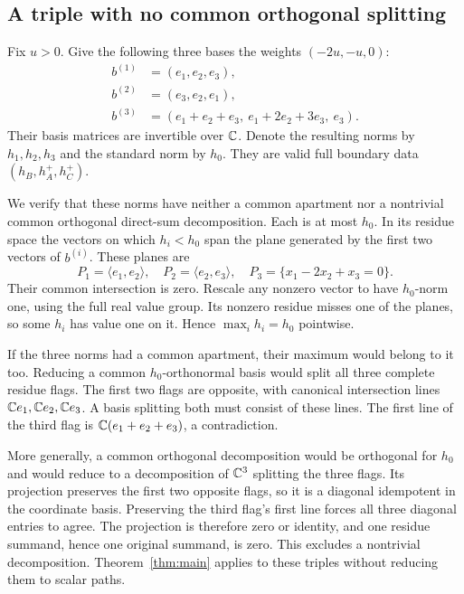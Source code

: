 \subsection{A triple with no common orthogonal splitting}
Fix $u>0$. Give the following three bases the weights $(-2u,-u,0)$:
\begin{equation}\label{eq:irreducibletriple}
 \begin{split}
 b^{(1)}&=(e_1,e_2,e_3),\\
 b^{(2)}&=(e_3,e_2,e_1),\\
 b^{(3)}&=(e_1+e_2+e_3,\ e_1+2e_2+3e_3,\ e_3).
 \end{split}
\end{equation}
Their basis matrices are invertible over $\mathbb C$. Denote the
resulting norms by $h_1,h_2,h_3$ and the standard norm by $h_0$.
They are valid full boundary data $(h_B,h_A^+,h_C^+)$.

We verify that these norms have neither a common apartment nor
a nontrivial common orthogonal direct-sum decomposition.
Each is at most $h_0$. In its residue space the vectors on
which $h_i<h_0$ span the plane generated by the first two
vectors of $b^{(i)}$. These planes are
\[
 P_1=\langle e_1,e_2\rangle,\quad
 P_2=\langle e_2,e_3\rangle,\quad
 P_3=\{x_1-2x_2+x_3=0\}.
\]
Their common intersection is zero. Rescale any nonzero vector
to have $h_0$-norm one, using the full real value group.
Its nonzero residue misses one of the planes, so some $h_i$
has value one on it. Hence $\max_i h_i=h_0$ pointwise.

If the three norms had a common apartment, their maximum
would belong to it too. Reducing a common $h_0$-orthonormal
basis would split all three complete residue flags. The
first two flags are opposite, with canonical intersection
lines $\mathbb C e_1,\mathbb C e_2,\mathbb C e_3$. A basis splitting both
must consist of these lines. The first line of the third
flag is $\mathbb C(e_1+e_2+e_3)$, a contradiction.

More generally, a common orthogonal decomposition would be
orthogonal for $h_0$ and would reduce to a decomposition of
$\mathbb C^3$ splitting the three flags. Its projection preserves
the first two opposite flags, so it is a diagonal idempotent
in the coordinate basis. Preserving the third flag's first
line forces all three diagonal entries to agree. The
projection is therefore zero or identity, and one residue
summand, hence one original summand, is zero. This excludes
a nontrivial decomposition. Theorem~\ref{thm:main} applies
to these triples without reducing them to scalar paths.

